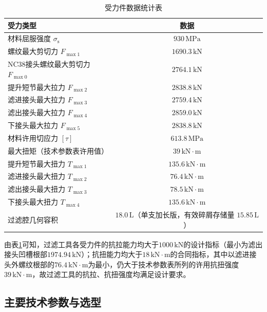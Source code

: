 \begin{table}[htbp]
    \centering
    \caption{受力件数据统计表}
    \label{tab:force_data_filter}
    \renewcommand{\arraystretch}{1.5} %
    \begin{tabularx}{.9\textwidth}{Xc}
        \toprule %
        受力类型 & 数据 \\
        \midrule %
        材料屈服强度 $\sigma_{\mathrm{s}}$ & $930\,\text{MPa}$ \\
        螺纹最大剪切力 $F_{\max1}$ & $1690.3\,\text{kN}$ \\
        NC38接头螺纹最大剪切力 $F_{\max0}$ & $2764.1\,\text{kN}$ \\
        提升短节最大拉力 $F_{\max2}$ & $2838.8\,\text{kN}$ \\
        滤进接头最大拉力 $F_{\max3}$ & $2759.4\,\text{kN}$ \\
        滤出接头最大拉力 $F_{\max4}$ & $2859.0\,\text{kN}$ \\
        下接头最大拉力 $F_{\max5}$ & $2838.8\,\text{kN}$ \\
        材料许用切应力 $[\tau]$ & $613.8\,\text{MPa}$ \\
        最大扭矩（技术参数表许用值） & $39\,\text{kN}\cdot\text{m}$ \\
        提升短节最大扭力 $T_{\max1}$ & $135.6\,\text{kN}\cdot\text{m}$ \\
        滤进接头最大扭力 $T_{\max2}$ & $76.4\,\text{kN}\cdot\text{m}$ \\
        滤出接头最大扭力 $T_{\max3}$ & $78.5\,\text{kN}\cdot\text{m}$ \\
        下接头最大扭力 $T_{\max4}$ & $135.6\,\text{kN}\cdot\text{m}$ \\
        过滤腔几何容积 & $18.0\,\text{L}$（单支加长版，有效碎屑存储量 $15.85\,\text{L}$） \\
        \bottomrule %
    \end{tabularx}
\end{table}

由表\ref{tab:force_data_filter}可知，过滤工具各受力件的抗拉能力均大于$1000\,\text{kN}$的设计指标（最小为滤出接头凹槽根部$1974.94\,\text{kN}$）；抗扭能力均大于$18\,\text{kN}\cdot\text{m}$的合同指标，其中以滤进接头外螺纹根部的$76.4\,\text{kN}\cdot\text{m}$为最小，仍大于技术参数表所列的许用抗扭强度$39\,\text{kN}\cdot\text{m}$，故过滤工具的抗拉、抗扭强度均满足设计要求。


\subsection{主要技术参数与选型}

